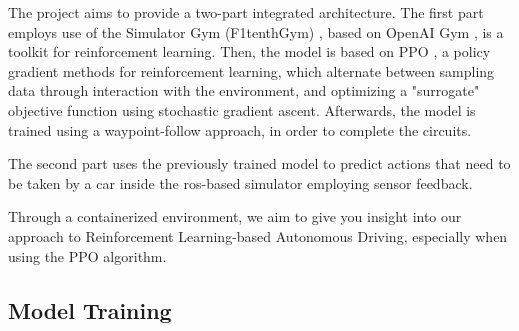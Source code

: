 \documentclass[conference]{IEEEtran}
\begin{document}




The project aims to provide a two-part integrated architecture. The first part employs use of the Simulator Gym (F1tenthGym) \cite{F1tenthGym}, based on OpenAI Gym \cite{OpenAIGym}, is a toolkit for reinforcement learning.
%
Then, the model is based on PPO \cite{PPOOpenAI}, a policy gradient methods for reinforcement learning, which alternate between sampling data through interaction with the environment, and optimizing a "surrogate" objective function using stochastic gradient ascent.
%
Afterwards, the model is trained using a waypoint-follow approach, in order to complete the circuits.

The second part uses the previously trained model to predict actions that need to be taken by a car inside the ros-based simulator employing sensor feedback.

Through a containerized environment, we aim to give you insight into our approach to Reinforcement Learning-based Autonomous Driving, especially when using the PPO algorithm.

%
%
%
\subsection{Model Training}


\end{document}
